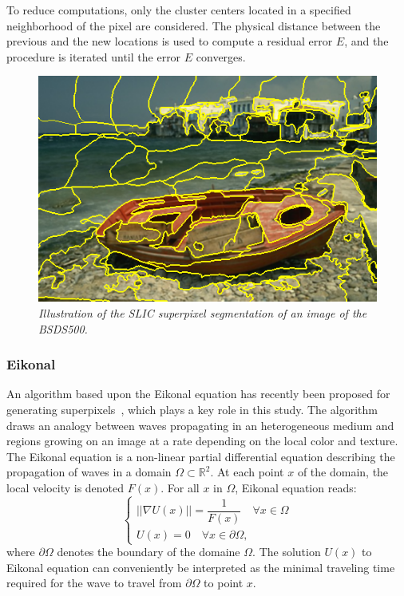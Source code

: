 \documentclass{article}
\begin{document}
            To reduce computations, only the cluster centers located in a specified neighborhood of the pixel are considered. The physical distance between the previous and the new locations is used to compute a residual error $E$, and the procedure is iterated until the error $E$ converges.

            \begin{figure}[!ht]
                \centering
                \includegraphics[width=.5\linewidth]{pics/slic.png}
                \caption{\textit{Illustration of the SLIC superpixel segmentation of an image of the BSDS500.}}
            \end{figure}

        \subsubsection{Eikonal}

            An algorithm based upon the Eikonal equation has recently been proposed for generating superpixels~\cite{figliuzzi2019}, which plays a key role in this study. The algorithm draws an analogy between waves propagating in an heterogeneous medium and regions growing on an image at a rate depending on the local color and texture.
            The Eikonal equation is a non-linear partial differential equation describing the propagation of waves in a domain $\Omega \subset \mathbb{R}^2$. At each point $x$ of the domain, the local velocity is denoted $F(x)$. For all $x$ in $\Omega $, Eikonal equation reads:
            \begin{equation}
              \begin{cases}
                ||\nabla U(x)|| = \dfrac{1}{F(x)} \quad \forall x \in \Omega \\
                U(x) = 0    \quad \forall x \in \partial \Omega,
              \end{cases}
            \end{equation}
            where $\partial \Omega $ denotes the boundary of the domaine $\Omega $. The solution $U(x)$ to Eikonal equation can conveniently be interpreted as the minimal traveling time required for the wave to travel from $\partial \Omega$ to point $x$.
\end{document}
